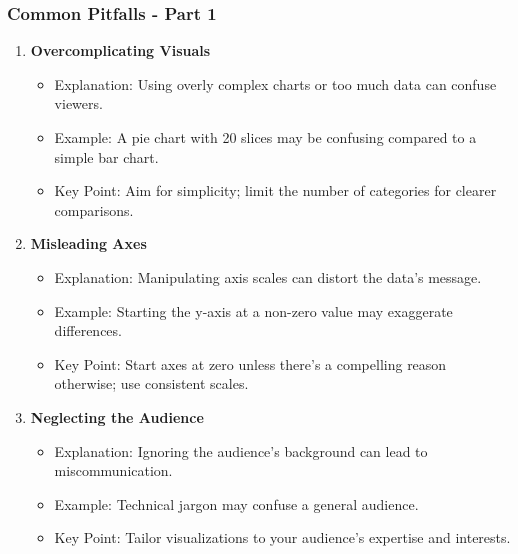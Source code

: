 \documentclass[aspectratio=169]{beamer}
\begin{document}
\begin{frame}[fragile]
    \frametitle{Common Pitfalls - Part 1}
    \begin{enumerate}
        \item \textbf{Overcomplicating Visuals}
            \begin{itemize}
                \item Explanation: Using overly complex charts or too much data can confuse viewers.
                \item Example: A pie chart with 20 slices may be confusing compared to a simple bar chart.
                \item Key Point: Aim for simplicity; limit the number of categories for clearer comparisons.
            \end{itemize}
        
        \item \textbf{Misleading Axes}
            \begin{itemize}
                \item Explanation: Manipulating axis scales can distort the data's message.
                \item Example: Starting the y-axis at a non-zero value may exaggerate differences.
                \item Key Point: Start axes at zero unless there's a compelling reason otherwise; use consistent scales.
            \end{itemize}

        \item \textbf{Neglecting the Audience}
            \begin{itemize}
                \item Explanation: Ignoring the audience's background can lead to miscommunication.
                \item Example: Technical jargon may confuse a general audience.
                \item Key Point: Tailor visualizations to your audience's expertise and interests.
            \end{itemize}
    \end{enumerate}
\end{frame}
\end{document}
